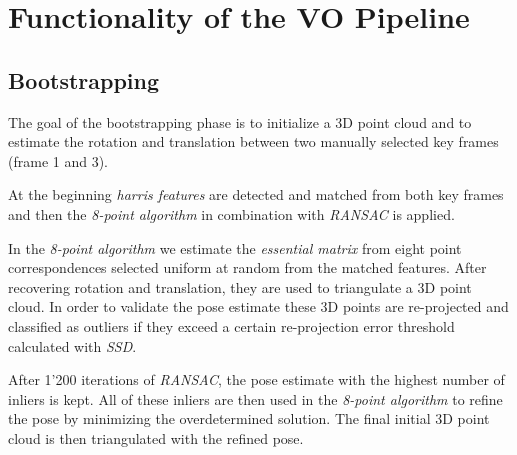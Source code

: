 \chapter{Functionality of the VO Pipeline}
\vspace{-10mm} 

\section{Bootstrapping}
The goal of the bootstrapping phase is to initialize a 3D point cloud and to estimate the rotation and translation between two manually selected key frames (frame 1 and 3).

At the beginning \emph{harris features} are detected and matched from both key frames and then the \emph{8-point algorithm} in combination with \emph{RANSAC} is applied. 

In the \emph{8-point algorithm} we estimate the \emph{essential matrix} from eight point correspondences selected uniform at random from the matched features. After recovering rotation and translation, they are used to triangulate a 3D point cloud. In order to validate the pose estimate these 3D points are re-projected and classified as outliers if they exceed a certain re-projection error threshold calculated with \emph{SSD}. 

After 1'200 iterations of \emph{RANSAC}, the pose estimate with the highest number of inliers is kept. All of these inliers are then used in the \emph{8-point algorithm} to refine the pose by minimizing the overdetermined solution. The final initial 3D point cloud is then triangulated with the refined pose.

